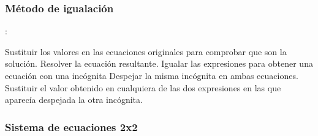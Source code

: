 \documentclass[examen,answers]{RDS_unit}
\begin{document}
\begin{questions}
{    \subsubsection{Método de igualación}:
            \begin{checkboxes}
                        \choice \fillin[5][0cm] Sustituir los valores en las ecuaciones originales para comprobar que son la soluci\'on.
                        \choice \fillin[3][0cm] Resolver la ecuaci\'on resultante.
                        \choice \fillin[2][0cm] Igualar las expresiones para obtener una ecuaci\'on con una inc\'ognita
                        \choice \fillin[1][0cm] Despejar la misma inc\'ognita en ambas ecuaciones.
                        \choice \fillin[4][0cm] Sustituir el valor obtenido en cualquiera de las dos expresiones en las que aparec\'ia despejada la otra inc\'ognita.
                  \end{checkboxes}
    }
    \subsubsection{Sistema de ecuaciones 2x2}

\end{questions}
\end{document}
